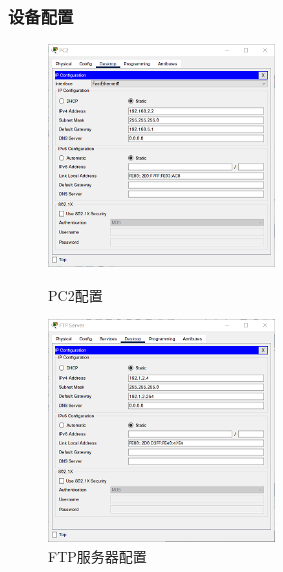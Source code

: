 \documentclass{imutthesis}
\begin{document}
\subsubsection{设备配置}
\begin{figure}[h]
    \centering
    \begin{minipage}[t]{0.48\textwidth}
        \centering
        \includegraphics[width=6cm]{PC2.png}
        \caption{PC2配置}
    \end{minipage}
    \begin{minipage}[t]{0.48\textwidth}
        \centering
        \includegraphics[width=6cm]{FTP服务器配置.png}
        \caption{FTP服务器配置}
    \end{minipage}
\end{figure}
\end{document}

